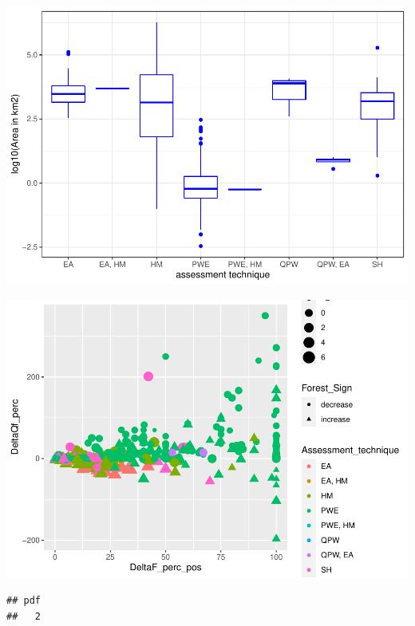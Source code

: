 \documentclass[]{elsarticle} %
\newenvironment{Shaded}{\begin{snugshade}}{\end{snugshade}}
\newcommand{\DataTypeTok}[1]{\textcolor[rgb]{0.13,0.29,0.53}{#1}}
\newcommand{\DecValTok}[1]{\textcolor[rgb]{0.00,0.00,0.81}{#1}}
\newcommand{\FloatTok}[1]{\textcolor[rgb]{0.00,0.00,0.81}{#1}}
\newcommand{\KeywordTok}[1]{\textcolor[rgb]{0.13,0.29,0.53}{\textbf{#1}}}
\newcommand{\NormalTok}[1]{#1}
\newcommand{\OperatorTok}[1]{\textcolor[rgb]{0.81,0.36,0.00}{\textbf{#1}}}
\newcommand{\StringTok}[1]{\textcolor[rgb]{0.31,0.60,0.02}{#1}}
\begin{document}
\includegraphics{Forest_and_Water_files/figure-latex/unnamed-chunk-24-1.pdf}

\includegraphics{Forest_and_Water_files/figure-latex/unnamed-chunk-25-1.pdf}

\begin{verbatim}
## pdf 
##   2
\end{verbatim}

\begin{Shaded}
\end{Shaded}
\end{document}
